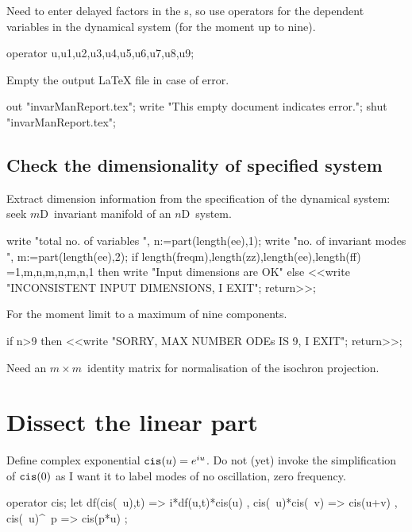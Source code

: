 \documentclass[11pt,a5paper]{article}
\begin{document}
Need to enter delayed factors in the \ode{}s, so use
operators for the dependent variables in the dynamical
system (for the moment up to nine).
\begin{reduce}
operator u,u1,u2,u3,u4,u5,u6,u7,u8,u9;
\end{reduce}

Empty the output LaTeX file in case of error.
\begin{reduce}
out "invarManReport.tex";
write "This empty document indicates error.";
shut "invarManReport.tex";
\end{reduce}


 


\subsection{Check the dimensionality of specified system}
Extract dimension information from the specification of the
dynamical system: seek $m$D~invariant manifold of an
$n$D~system.
\begin{reduce}
write "total no. of variables ",
n:=part(length(ee),1);
write "no. of invariant modes ",
m:=part(length(ee),2);
if {length(freqm),length(zz),length(ee),length(ff)}
  ={{1,m},{n,m},{n,m},{n,1}} 
  then write "Input dimensions are OK" 
  else <<write "INCONSISTENT INPUT DIMENSIONS, I EXIT"; 
      return>>;
\end{reduce}

For the moment limit to a maximum of nine components.
\begin{reduce}
if n>9 then <<write "SORRY, MAX NUMBER ODEs IS 9, I EXIT"; 
    return>>;
\end{reduce}

Need an \(m\times m\)~identity matrix for normalisation of the isochron projection.


\section{Dissect the linear part}

Define complex exponential $\verb|cis|(u)=e^{iu}$.
Do not (yet) invoke the simplification of $\verb|cis|(0)$ as I want it to label modes of no oscillation, zero frequency.

\begin{reduce}
operator cis;
let { df(cis(~u),t) => i*df(u,t)*cis(u)
    , cis(~u)*cis(~v) => cis(u+v)
    , cis(~u)^~p => cis(p*u)
    };
\end{reduce}
\end{document}
